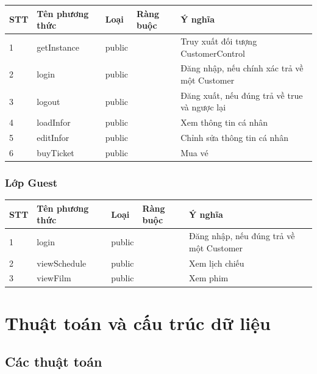 \documentclass[a4paper, 12pt]{article}
\begin{document}
\begin{table}[H]
\centering
\begin{tabular}{|l|l|l|l|l|}
\hline
STT & Tên phương thức & Loại   & Ràng buộc & Ý nghĩa                                      \\ \hline
1   & getInstance     & public &           & Truy xuất đối tượng CustomerControl          \\ \hline
2   & login           & public &           & Đăng nhập, nếu chính xác trả về một Customer \\ \hline
3   & logout          & public &           & Đăng xuất, nếu đúng trả về true và ngược lại \\ \hline
4   & loadInfor       & public &           & Xem thông tin cá nhân                        \\ \hline
5   & editInfor       & public &           & Chỉnh sửa thông tin cá nhân                  \\ \hline
6   & buyTicket       & public &           & Mua vé                                       \\ \hline
\end{tabular}
\end{table}

\subsubsection{Lớp Guest}
\begin{table}[H]
\centering
\begin{tabular}{|l|l|l|l|l|}
\hline
STT & Tên phương thức & Loại   & Ràng buộc & Ý nghĩa                                 \\ \hline
1   & login           & public &           & Đăng nhập, nếu đúng trả về một Customer \\ \hline
2   & viewSchedule    & public &           & Xem lịch chiếu                          \\ \hline
3   & viewFilm        & public &           & Xem phim                                \\ \hline
\end{tabular}
\end{table}

\clearpage

\section{Thuật toán và cấu trúc dữ liệu}

\subsection{Các thuật toán}
\end{document}
